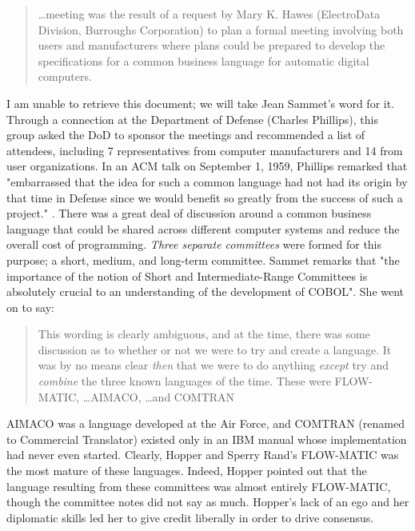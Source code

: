 \begin{quotation}
	\dots meeting was the result of a request by
	Mary K. Hawes (ElectroData Division, Burroughs Corporation) to plan a formal meeting
	involving both users and manufacturers where plans could be prepared to develop the
	specifications for a common business language for automatic digital computers.
\end{quotation}

I am unable to retrieve this document; we will take Jean Sammet's word for it.
Through a connection at the Department of Defense (Charles Phillips), this group
asked the DoD to sponsor the meetings and recommended a list of attendees, including
7 representatives from computer manufacturers and 14 from user organizations.
In an ACM talk on September 1, 1959, Phillips remarked that "embarrassed that
the idea for such a common language had not had its origin by that time in
Defense since we would benefit so greatly from the success of such a project."
\cite[Phillips, as quoted by Sammet in]{sammet_programming_languages_history_and_fundamentals_1969}.
There was a great deal of discussion around a common business language
that could be shared across different computer systems and reduce the overall cost of programming.
\textit{Three separate committees} were formed for this purpose; a short, medium, and long-term committee.
Sammet remarks that "the importance of the notion of Short and
Intermediate-Range Committees is absolutely crucial to an understanding of the
development of COBOL"\cite{sammet_early_history_of_cobol_1978}.
She went on to say:

\begin{quotation}
	This wording is clearly ambiguous, and at the time, there was some discussion
	as to whether or not we were to try and create a language. It was by no means
	clear \textit{then} that we were to do anything \textit{except} try and
	\textit{combine} the three known languages of the time.
	These were FLOW-MATIC, \dots AIMACO, \dots and COMTRAN
\end{quotation}

AIMACO was a language developed at the Air Force, and COMTRAN (renamed to Commercial Translator)
existed only in an IBM manual whose implementation had never even started.
Clearly, Hopper and Sperry Rand's FLOW-MATIC was the most mature of these languages.
Indeed, Hopper pointed out that the language resulting from these committees
was almost entirely FLOW-MATIC\cite{Hopper_1980_Oral_History}, though the committee notes
did not say as much. Hopper's lack of an ego and her diplomatic skills
led her to give credit liberally in order to drive consensus.

